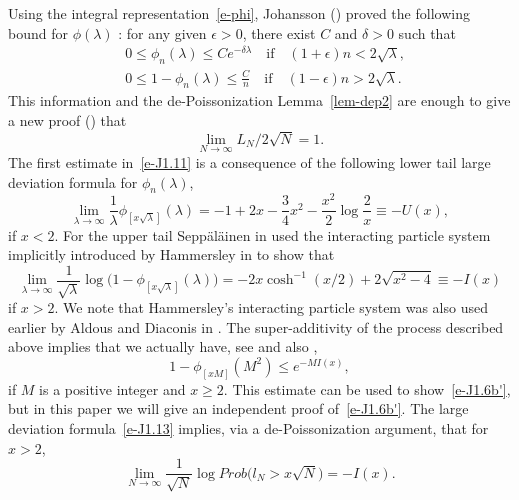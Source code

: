 \documentclass{amsart}
\theoremstyle{definition}
\theoremstyle{remark}
\numberwithin{equation}{section}
\begin{document}
Using the integral representation~\eqref{e-phi}, 
Johansson (\cite{Johan}) proved 
the following bound for $\phi(\lambda)$ :     
for any given $\epsilon >0$, there exist $C$ and $\delta>0$ such that 
\begin{equation}\label{e-J1.11}
  \begin{split}
    &0\le\phi_n(\lambda)\le Ce^{-\delta\lambda}
\quad\text{if}\quad (1+\epsilon)n< 2\sqrt{\lambda},\\
    &0\le 1- \phi_n(\lambda) \le \frac{C}{n}
\quad\text{if}\quad (1-\epsilon)n> 2\sqrt{\lambda}.
  \end{split}
\end{equation}
This information and the de-Poissonization Lemma~\ref{lem-dep2}  
are enough to give a new proof (\cite{Johan}) that
\begin{equation}\label{e-J1.11'}
  \lim_{N\to\infty} L_N/2\sqrt{N} =1.
\end{equation}
The first estimate in~\eqref{e-J1.11} is a consequence of the following lower
tail large deviation formula for $\phi_n(\lambda)$,
\begin{equation}\label{e-J1.12'}
\lim_{\lambda\to\infty}\frac
1{\lambda}\phi_{[x\sqrt{\lambda}]}(\lambda)=              %
-1+2x-\frac 34x^2-\frac{x^2}2\log\frac 2x\equiv -U(x),
\end{equation}
if $x<2$.
For the upper tail Sepp\"al\"ainen in \cite{Se2} used
the interacting particle system implicitly
introduced by Hammersley in \cite{Ha} to show that
\begin{equation}\label{e-J1.13}
  \lim_{\lambda\to\infty} \frac1{\sqrt{\lambda}}
\log\bigl(1-\phi_{[x\sqrt{\lambda}]}(\lambda)\bigr) = -2x\cosh^{-1}(x/2)
+2\sqrt{x^2-4}\equiv -I(x)
\end{equation}
if $x>2$. We note that Hammersley's interacting particle system was also used
earlier by Aldous and Diaconis in \cite{AD}.
The super-additivity of the process described above implies that we
actually have, see \cite{Se2} and also \cite{Ki},
\begin{equation}\label{e-J1.13'}
1-\phi_{[xM]}(M^2)\le e^{-MI(x)},    %
\end{equation}
if $M$ is a positive integer and $x\ge 2$. This estimate can be used
to show~\eqref{e-J1.6b'}, but in this paper we will give an independent proof
of~\eqref{e-J1.6b'}.
The large deviation formula~\eqref{e-J1.13} implies, via a de-Poissonization
argument, that for $x>2$,
\begin{equation}\label{e-J1.14}
  \lim_{N\to\infty} \frac1{\sqrt{N}} \log Prob\bigl( l_N>x\sqrt{N}\bigr)
=-I(x).
\end{equation}
\end{document}
